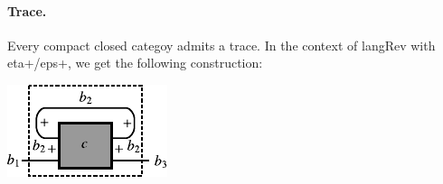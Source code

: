 \documentclass[preprint]{sigplanconf}
\begin{document}
\paragraph*{Trace.}
Every compact closed categoy admits a trace. In the context of {{langRev}}
with {{eta+}}/{{eps+}}, we get the following construction:

\begin{multicols}{2}
\begin{center}
  \includegraphics{diagrams/trace.pdf}
\end{center}


\end{multicols}


\end{document}
